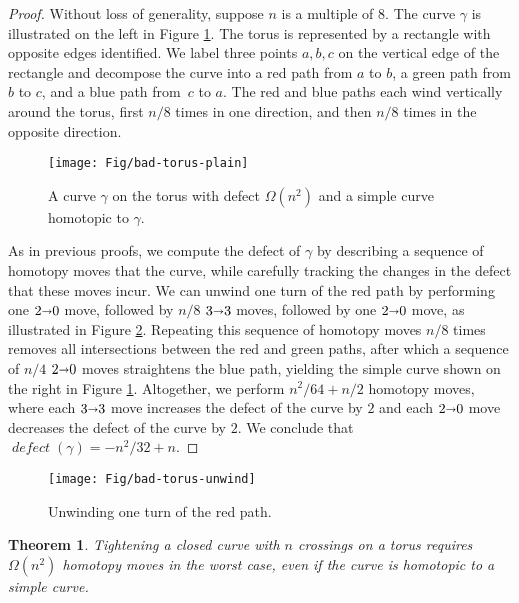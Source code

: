 \documentclass[11pt,twoside]{article}
\def\arcto{\mathord\shortrightarrow}
\def\arc#1#2{#1\arcto#2}
\def\Defect{\operatorname{\mathit{defect}}}
\let\EDIT\relax
\newtheorem{theorem}{Theorem}[section]
\numberwithin{figure}{section}
\begin{document}
\begin{proof}
Without loss of generality, suppose $n$ is a multiple of $8$. The curve $\gamma$ is illustrated on the left in Figure \ref{F:bad-torus}. The torus is represented by a rectangle with opposite edges identified. We label three points $a,b,c$ on the vertical edge of the rectangle and decompose the curve into a red path from $a$ to $b$, a green path from $b$ to $c$, and a blue path from~$c$ to $a$. The red and blue paths each wind vertically around the torus, first $n/8$ times in one direction, and then $n/8$ times in the opposite direction.

\begin{figure}[ht]
\centering\texttt{[image: Fig/bad-torus-plain]}
\caption{A curve $\gamma$ on the torus with defect $\Omega(n^2)$ and a simple curve homotopic to $\gamma$.}
\label{F:bad-torus}
\end{figure}

As in previous proofs, we compute the defect of $\gamma$ by describing a sequence of homotopy moves that \EDIT{simplifies} the curve, while carefully tracking the changes in the defect that these moves incur. We can unwind one turn of the red path by performing one $\arc20$ move, followed by $n/8$ $\arc33$ moves, followed by one $\arc20$ move, as illustrated in Figure \ref{F:bad-torus-unwind}. Repeating this sequence of homotopy moves $n/8$ times removes all intersections between the red and green paths, after which a sequence of $n/4$ $\arc20$ moves straightens the blue path, yielding the simple curve shown on the right in Figure \ref{F:bad-torus}. Altogether, we perform $n^2/64 + n/2$ homotopy moves, where each $\arc33$ move increases the defect of the curve by $2$ and each $\arc20$ move decreases the defect of the curve by $2$. We conclude that $\Defect(\gamma) = -n^2/32 + n$.
\end{proof}

\begin{figure}[ht]
\centering\texttt{[image: Fig/bad-torus-unwind]}
\caption{Unwinding one turn of the red path.}
\label{F:bad-torus-unwind}
\end{figure}

\begin{theorem}
\label{Th:lower-torus}
Tightening a closed curve with $n$ crossings on a torus requires $\Omega(n^2)$ homotopy moves in the worst case, even if the curve is homotopic to a simple curve.
\end{theorem}

\end{document}
